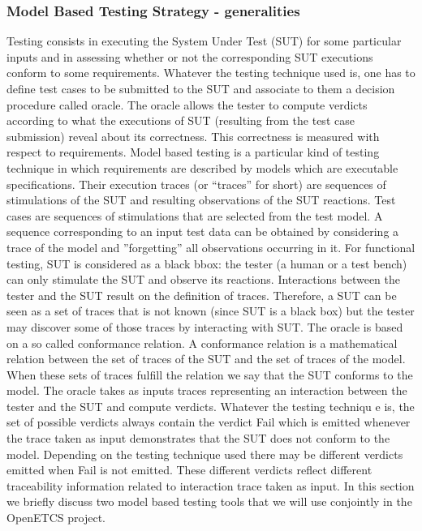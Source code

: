 \documentclass{template/openetcs_report}
\begin{document}
\subsubsection{Model Based Testing Strategy - generalities}
Testing consists in executing the System Under Test (SUT)
 for some particular inputs and in assessing whether or not the
 corresponding SUT executions conform to some requirements.
 Whatever the testing technique used is, one has to define test cases
 to be submitted to the SUT and associate to them a decision procedure
 called oracle. The oracle allows the tester to compute verdicts according 
to what the executions of SUT (resulting from the test case submission) 
reveal about its correctness.
This correctness is measured with respect to requirements. Model based
 testing is a particular kind of testing technique in which requirements are 
described by models which are executable specifications. Their execution
 traces (or ``traces'' for short) are sequences of stimulations of the SUT and
 resulting observations of the SUT reactions. Test cases are sequences of 
stimulations that are selected from the test model. A sequence corresponding
 to an input test data can be obtained by considering a trace of the model and
 ”forgetting” all observations occurring in it. For functional testing, SUT is 
considered as a black bbox: the tester (a human or a test bench) can only
 stimulate the SUT and observe its reactions. Interactions between the tester
 and the SUT result on the definition of traces. Therefore, a SUT can be seen
 as a set of traces that is not known (since SUT is a black box) but the tester
 may discover some of those traces by interacting with SUT. The oracle is based
 on a so called conformance relation. A conformance relation is a mathematical
 relation between the set of traces of the SUT and the set of traces of the model.
 When these sets of traces fulfill the relation we say that the SUT conforms to 
the model. The oracle takes as inputs traces representing an interaction between
 the tester and the SUT and compute verdicts. Whatever the testing techniqu
e is, the set of possible verdicts always contain the verdict Fail which is emitted 
whenever the trace taken as input demonstrates that the SUT does not conform 
to the model. Depending on the testing technique used there may be different 
verdicts emitted when Fail is not emitted. These different verdicts reflect different
 traceability information related to interaction trace taken as input. In this section
 we briefly discuss two model based testing tools that we will use conjointly in the 
OpenETCS project.
\end{document}

